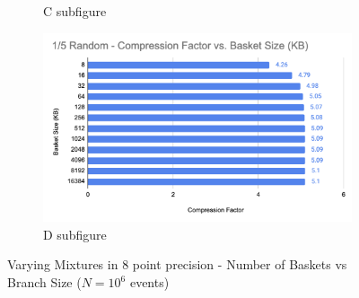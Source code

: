 \begin{figure}[h]
\begin{subfigure}{.5\textwidth}
        \caption{C subfigure}
        \label{fig:toymodel_328_compF_vs_basketsize_subC}
      \end{subfigure}%
      \begin{subfigure}{.5\textwidth}
        \centering
        \includegraphics[width=\textwidth]{content/toymodel_content/3.28/1_of_5.png}
        \caption{D subfigure}
        \label{fig:toymodel_328_compF_vs_basketsize_subD}
      \end{subfigure}%
    \caption{Varying Mixtures in 8 point precision - Number of Baskets vs Branch Size ($N=10^6$ events)}
    \label{fig:toymodel_328_compF_vs_basketsize}
\end{figure}

